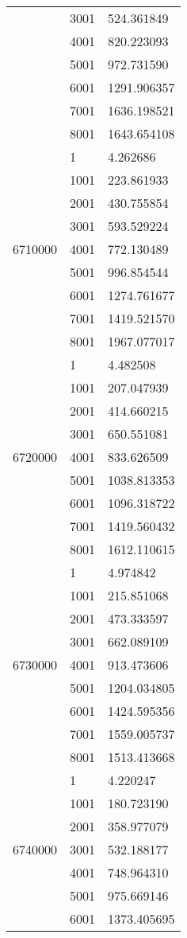 \begin{table}[htb!]
\begin{tabular}{lll}
 & 3001 & 524.361849 \\
 & 4001 & 820.223093 \\
 & 5001 & 972.731590 \\
 & 6001 & 1291.906357 \\
 & 7001 & 1636.198521 \\
 & 8001 & 1643.654108 \\
\multirow[c]{9}{*}{6710000} & 1 & 4.262686 \\
 & 1001 & 223.861933 \\
 & 2001 & 430.755854 \\
 & 3001 & 593.529224 \\
 & 4001 & 772.130489 \\
 & 5001 & 996.854544 \\
 & 6001 & 1274.761677 \\
 & 7001 & 1419.521570 \\
 & 8001 & 1967.077017 \\
\multirow[c]{9}{*}{6720000} & 1 & 4.482508 \\
 & 1001 & 207.047939 \\
 & 2001 & 414.660215 \\
 & 3001 & 650.551081 \\
 & 4001 & 833.626509 \\
 & 5001 & 1038.813353 \\
 & 6001 & 1096.318722 \\
 & 7001 & 1419.560432 \\
 & 8001 & 1612.110615 \\
\multirow[c]{9}{*}{6730000} & 1 & 4.974842 \\
 & 1001 & 215.851068 \\
 & 2001 & 473.333597 \\
 & 3001 & 662.089109 \\
 & 4001 & 913.473606 \\
 & 5001 & 1204.034805 \\
 & 6001 & 1424.595356 \\
 & 7001 & 1559.005737 \\
 & 8001 & 1513.413668 \\
\multirow[c]{9}{*}{6740000} & 1 & 4.220247 \\
 & 1001 & 180.723190 \\
 & 2001 & 358.977079 \\
 & 3001 & 532.188177 \\
 & 4001 & 748.964310 \\
 & 5001 & 975.669146 \\
 & 6001 & 1373.405695 \\

\end{tabular}
\end{table}
